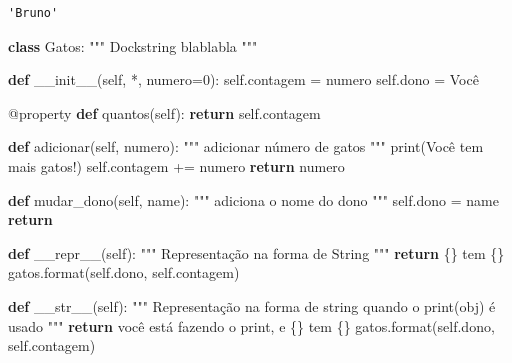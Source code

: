 \documentclass[
  letterpaper,
  DIV=11,
  numbers=noendperiod]{scrreprt}
\newenvironment{Shaded}{\begin{snugshade}}{\end{snugshade}}
\newcommand{\AttributeTok}[1]{\textcolor[rgb]{0.40,0.45,0.13}{#1}}
\newcommand{\BuiltInTok}[1]{\textcolor[rgb]{0.00,0.23,0.31}{#1}}
\newcommand{\CommentTok}[1]{\textcolor[rgb]{0.37,0.37,0.37}{#1}}
\newcommand{\ControlFlowTok}[1]{\textcolor[rgb]{0.00,0.23,0.31}{\textbf{#1}}}
\newcommand{\DecValTok}[1]{\textcolor[rgb]{0.68,0.00,0.00}{#1}}
\newcommand{\FunctionTok}[1]{\textcolor[rgb]{0.28,0.35,0.67}{#1}}
\newcommand{\KeywordTok}[1]{\textcolor[rgb]{0.00,0.23,0.31}{\textbf{#1}}}
\newcommand{\NormalTok}[1]{\textcolor[rgb]{0.00,0.23,0.31}{#1}}
\newcommand{\OperatorTok}[1]{\textcolor[rgb]{0.37,0.37,0.37}{#1}}
\newcommand{\SpecialCharTok}[1]{\textcolor[rgb]{0.37,0.37,0.37}{#1}}
\newcommand{\StringTok}[1]{\textcolor[rgb]{0.13,0.47,0.30}{#1}}
\newcommand{\VariableTok}[1]{\textcolor[rgb]{0.07,0.07,0.07}{#1}}
\begin{document}
\begin{verbatim}
'Bruno'
\end{verbatim}

\begin{Shaded}
\begin{Highlighting}[]
\KeywordTok{class}\NormalTok{ Gatos:}
    \CommentTok{""" }
\CommentTok{    Dockstring blablabla}
\CommentTok{    """}

    \KeywordTok{def} \FunctionTok{\_\_init\_\_}\NormalTok{(}\VariableTok{self}\NormalTok{, }\OperatorTok{*}\NormalTok{, numero}\OperatorTok{=}\DecValTok{0}\NormalTok{):}
        \VariableTok{self}\NormalTok{.contagem }\OperatorTok{=}\NormalTok{ numero}
        \VariableTok{self}\NormalTok{.dono }\OperatorTok{=} \StringTok{\textquotesingle{}Você\textquotesingle{}}

    \AttributeTok{@property}
    \KeywordTok{def}\NormalTok{ quantos(}\VariableTok{self}\NormalTok{):}
        \ControlFlowTok{return} \VariableTok{self}\NormalTok{.contagem}

    \KeywordTok{def}\NormalTok{ adicionar(}\VariableTok{self}\NormalTok{, numero):}
        \CommentTok{"""}
\CommentTok{        adicionar número de gatos}
\CommentTok{        """}
        \BuiltInTok{print}\NormalTok{(}\StringTok{\textquotesingle{}Você tem mais gatos!\textquotesingle{}}\NormalTok{)}
        \VariableTok{self}\NormalTok{.contagem }\OperatorTok{+=}\NormalTok{ numero}
        \ControlFlowTok{return}\NormalTok{ numero}

    \KeywordTok{def}\NormalTok{ mudar\_dono(}\VariableTok{self}\NormalTok{, name):}
        \CommentTok{"""}
\CommentTok{        adiciona o nome do dono}
\CommentTok{        """}
        \VariableTok{self}\NormalTok{.dono }\OperatorTok{=}\NormalTok{ name}
        \ControlFlowTok{return}

    \KeywordTok{def} \FunctionTok{\_\_repr\_\_}\NormalTok{(}\VariableTok{self}\NormalTok{):}
        \CommentTok{"""}
\CommentTok{        Representação na forma de String}
\CommentTok{        """}
        \ControlFlowTok{return} \StringTok{\textquotesingle{}}\SpecialCharTok{\{\}}\StringTok{ tem }\SpecialCharTok{\{\}}\StringTok{ gatos\textquotesingle{}}\NormalTok{.}\BuiltInTok{format}\NormalTok{(}\VariableTok{self}\NormalTok{.dono, }\VariableTok{self}\NormalTok{.contagem)}

    \KeywordTok{def} \FunctionTok{\_\_str\_\_}\NormalTok{(}\VariableTok{self}\NormalTok{):}
        \CommentTok{"""}
\CommentTok{        Representação na forma de string quando o print(obj) é usado}
\CommentTok{        """}
        \ControlFlowTok{return} \StringTok{\textquotesingle{}você está fazendo o print, e }\SpecialCharTok{\{\}}\StringTok{ tem }\SpecialCharTok{\{\}}\StringTok{ gatos\textquotesingle{}}\NormalTok{.}\BuiltInTok{format}\NormalTok{(}\VariableTok{self}\NormalTok{.dono, }\VariableTok{self}\NormalTok{.contagem)}
\end{Highlighting}
\end{Shaded}
\end{document}
